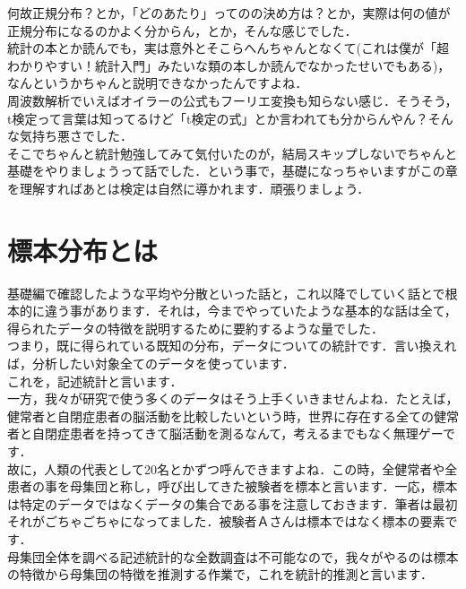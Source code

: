 \documentclass[11pt,a4paper,uplatex]{ujreport} 	%
\begin{document}
何故正規分布？とか，「どのあたり」ってのの決め方は？とか，実際は何の値が正規分布になるのかよく分からん，とか，そんな感じでした．\\

統計の本とか読んでも，実は意外とそこらへんちゃんとなくて(これは僕が「超わかりやすい！統計入門」みたいな類の本しか読んでなかったせいでもある)，なんというかちゃんと説明できなかったんですよね．\\

周波数解析でいえばオイラーの公式もフーリエ変換も知らない感じ．そうそう，t検定って言葉は知ってるけど「t検定の式」とか言われても分からんやん？そんな気持ち悪さでした．\\

そこでちゃんと統計勉強してみて気付いたのが，結局スキップしないでちゃんと基礎をやりましょうって話でした．という事で，基礎になっちゃいますがこの章を理解すればあとは検定は自然に導かれます．頑張りましょう．

\section{標本分布とは}

基礎編で確認したような平均や分散といった話と，これ以降でしていく話とで根本的に違う事があります．それは，今までやっていたような基本的な話は全て，得られたデータの特徴を説明するために要約するような量でした．\\

つまり，既に得られている既知の分布，データについての統計です．言い換えれば，分析したい対象全てのデータを使っています．\\

これを，記述統計と言います．\\

一方，我々が研究で使う多くのデータはそう上手くいきませんよね．たとえば，健常者と自閉症患者の脳活動を比較したいという時，世界に存在する全ての健常者と自閉症患者を持ってきて脳活動を測るなんて，考えるまでもなく無理ゲーです．\\

故に，人類の代表として20名とかずつ呼んできますよね．この時，全健常者や全患者の事を母集団と称し，呼び出してきた被験者を標本と言います．一応，標本は特定のデータではなくデータの集合である事を注意しておきます．筆者は最初それがごちゃごちゃになってました．被験者Ａさんは標本ではなく標本の要素です．\\

母集団全体を調べる記述統計的な全数調査は不可能なので，我々がやるのは標本の特徴から母集団の特徴を推測する作業で，これを統計的推測と言います．\\
\end{document}
